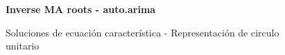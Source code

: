 
\vspace{4mm}	
\begin{figure}[H]
	\centering
	\textbf{Inverse MA roots - auto.arima}\par\medskip
	\caption{Soluciones de ecuación característica - Representación de circulo unitario}\label{fig}
\end{figure}


